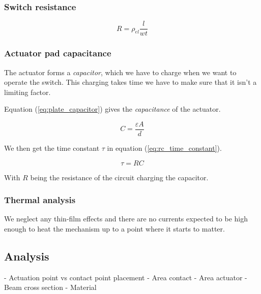 \subsubsection{Switch resistance}
\begin{equation}
	R = \rho_{el}\frac{l}{wt}
	\label{eq:resistance}
\end{equation}

\subsubsection{Actuator pad capacitance}
The actuator forms a \emph{capacitor}, which we have to charge when we want to operate the switch.
This charging takes time we have to make sure that it isn't a limiting factor.

Equation (\ref{eq:plate_capacitor}) gives the \emph{capacitance} of the actuator.

\begin{equation}
	C = \frac{\varepsilon A}{d}
	\label{eq:plate_capacitor}
\end{equation}

We then get the time constant $\tau$ in equation (\ref{eq:rc_time_constant}).

\begin{equation}
    \tau = RC
    \label{eq:rc_time_constant}
\end{equation}

With $R$ being the resistance of the circuit charging the capacitor.

\subsubsection{Thermal analysis}

We neglect any thin-film effects and there are no currents expected to be high enough to heat the mechanism up to a point where it starts to matter.

\subsection{Analysis}
\label{sec:analysis}
- Actuation point vs contact point placement
- Area contact
- Area actuator
- Beam cross section
- Material
